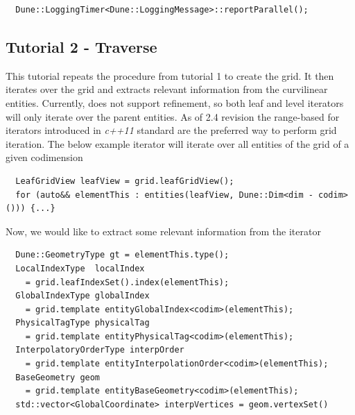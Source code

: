 \begin{mybox}
\begin{lstlisting}
  Dune::LoggingTimer<Dune::LoggingMessage>::reportParallel();
\end{lstlisting}
\end{mybox}



\subsection{Tutorial 2 - Traverse}
\label{usage-howto-tutorial-traverse}

This tutorial repeats the procedure from tutorial 1 to create the grid. It then iterates over the grid and extracts relevant information from the curvilinear entities. Currently, \curvgrid{} does not support refinement, so both leaf and level iterators will only iterate over the parent entities. As of \dune{} 2.4 revision the range-based for iterators introduced in \textit{c++11} standard are the preferred way to perform grid iteration. The below example iterator will iterate over all entities of the grid of a given codimension \\

\begin{mybox}
\begin{lstlisting}
  LeafGridView leafView = grid.leafGridView();
  for (auto&& elementThis : entities(leafView, Dune::Dim<dim - codim>())) {...}
\end{lstlisting}
\end{mybox}


Now, we would like to extract some relevant information from the iterator \\
\begin{mybox}
\begin{lstlisting}
  Dune::GeometryType gt = elementThis.type();
  LocalIndexType  localIndex
    = grid.leafIndexSet().index(elementThis);
  GlobalIndexType globalIndex
    = grid.template entityGlobalIndex<codim>(elementThis);
  PhysicalTagType physicalTag
    = grid.template entityPhysicalTag<codim>(elementThis);
  InterpolatoryOrderType interpOrder
    = grid.template entityInterpolationOrder<codim>(elementThis);
  BaseGeometry geom
    = grid.template entityBaseGeometry<codim>(elementThis);
  std::vector<GlobalCoordinate> interpVertices = geom.vertexSet()
\end{lstlisting}
\end{mybox}

